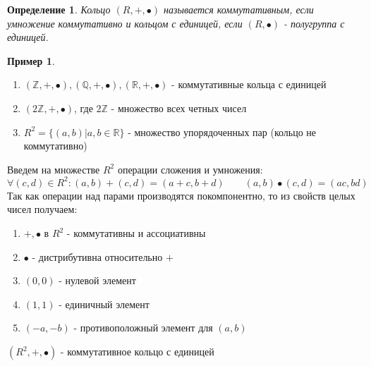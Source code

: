 \documentclass[12pt,oneside]{article}
\newtheorem{determ}[theorem]{Определение}
\theoremstyle{definition}
\newtheorem{example}[theorem]{Пример}
\newcommand{\ZZ}{\mathbb{Z}}
\newcommand{\QQ}{\mathbb{Q}}
\newcommand{\RR}{\mathbb{R}}
\begin{document}
\begin{determ}
	Кольцо $(R,+,\bullet)$ называется коммутативным, если умножение коммутативно и кольцом с единицей, если $(R,\bullet)$ - полугруппа с единицей.
\end{determ}

\begin{example}
	\begin{enumerate}[]
		\item $(\ZZ,+,\bullet), (\QQ,+,\bullet), (\RR,+,\bullet)$ - коммутативные кольца с единицей
		\item $(2\ZZ,+,\bullet)$, где $2\ZZ$ - множество всех четных чисел
		\item $R^2=\{(a,b)|a,b\in\RR\}$ - множество упорядоченных пар (кольцо не коммутативно)
	\end{enumerate}
	Введем на множестве $R^2$ операции сложения и умножения:
	\begin{equation}
	\forall(c,d)\in R^2: (a,b)+(c,d) = (a+c,b+d) \qquad (a,b)\bullet(c,d)=(ac,bd)
	\end{equation}
	Так как операции над парами производятся покомпонентно, то из свойств целых чисел получаем:
	\begin{enumerate}
		\item $+,\bullet$ в $R^2$ - коммутативны и ассоциативны
		\item $ \bullet $ - дистрибутивна относительно $+$
		\item $(0,0)$ - нулевой элемент
		\item $(1,1)$ - единичный элемент
		\item $(-a,-b)$ - противоположный элемент для $(a,b)$
	\end{enumerate}
	$(R^2,+,\bullet)$ - коммутативное кольцо с единицей
\end{example}
\end{document}
